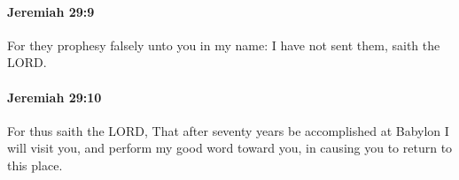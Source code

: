 		\paragraph{Jeremiah 29:9} %
			\label{JEREMIAH-29-9}

			For they prophesy falsely unto you in my name: I have not sent them, saith the LORD.


		\paragraph{Jeremiah 29:10} %
			\label{JEREMIAH-29-10}

			For thus saith the LORD, That after seventy years be accomplished at Babylon I will visit you, and perform my good word toward you, in causing you to return to this place.


